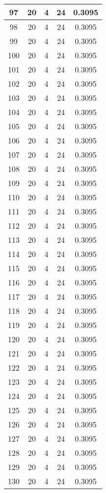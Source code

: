 \documentclass[letterpaper, 12pt]{article}
\begin{document}
\begin{longtable}{|c|c|c|c|c|}
\hline
97 & 20 & 4 & 24 & 0.3095 \\
\hline
98 & 20 & 4 & 24 & 0.3095 \\
\hline
99 & 20 & 4 & 24 & 0.3095 \\
\hline
100 & 20 & 4 & 24 & 0.3095 \\
\hline
101 & 20 & 4 & 24 & 0.3095 \\
\hline
102 & 20 & 4 & 24 & 0.3095 \\
\hline
103 & 20 & 4 & 24 & 0.3095 \\
\hline
104 & 20 & 4 & 24 & 0.3095 \\
\hline
105 & 20 & 4 & 24 & 0.3095 \\
\hline
106 & 20 & 4 & 24 & 0.3095 \\
\hline
107 & 20 & 4 & 24 & 0.3095 \\
\hline
108 & 20 & 4 & 24 & 0.3095 \\
\hline
109 & 20 & 4 & 24 & 0.3095 \\
\hline
110 & 20 & 4 & 24 & 0.3095 \\
\hline
111 & 20 & 4 & 24 & 0.3095 \\
\hline
112 & 20 & 4 & 24 & 0.3095 \\
\hline
113 & 20 & 4 & 24 & 0.3095 \\
\hline
114 & 20 & 4 & 24 & 0.3095 \\
\hline
115 & 20 & 4 & 24 & 0.3095 \\
\hline
116 & 20 & 4 & 24 & 0.3095 \\
\hline
117 & 20 & 4 & 24 & 0.3095 \\
\hline
118 & 20 & 4 & 24 & 0.3095 \\
\hline
119 & 20 & 4 & 24 & 0.3095 \\
\hline
120 & 20 & 4 & 24 & 0.3095 \\
\hline
121 & 20 & 4 & 24 & 0.3095 \\
\hline
122 & 20 & 4 & 24 & 0.3095 \\
\hline
123 & 20 & 4 & 24 & 0.3095 \\
\hline
124 & 20 & 4 & 24 & 0.3095 \\
\hline
125 & 20 & 4 & 24 & 0.3095 \\
\hline
126 & 20 & 4 & 24 & 0.3095 \\
\hline
127 & 20 & 4 & 24 & 0.3095 \\
\hline
128 & 20 & 4 & 24 & 0.3095 \\
\hline
129 & 20 & 4 & 24 & 0.3095 \\
\hline
130 & 20 & 4 & 24 & 0.3095 \\

\end{longtable}
\end{document}
